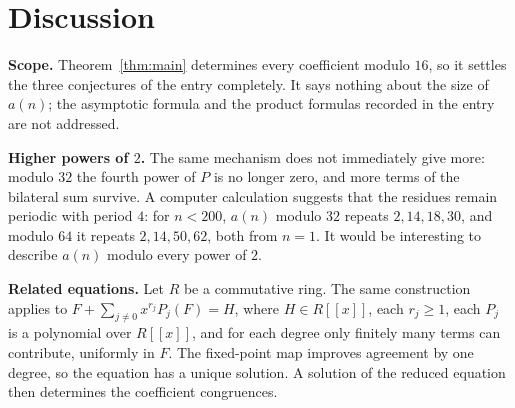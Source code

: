 \documentclass[11pt,a4paper]{article}
\theoremstyle{definition}
\theoremstyle{remark}
\newcommand{\ps}[1]{#1[[x]]}
\newcommand{\para}[1]{\par\medskip\noindent\textbf{#1}\enspace}
\begin{document}
\section{Discussion}\label{sec:discussion}

\para{Scope.} Theorem~\ref{thm:main} determines every coefficient modulo $16$, so it settles the three conjectures of the
entry completely. It says nothing about the size of $a(n)$; the asymptotic formula and the product formulas recorded in
the entry are not addressed.

\para{Higher powers of $2$.} The same mechanism does not immediately give more: modulo $32$ the fourth power of $P$ is
no longer zero, and more terms of the bilateral sum survive. A computer calculation suggests that the residues remain
periodic with period $4$: for $n<200$, $a(n)$ modulo $32$ repeats $2,14,18,30$, and modulo $64$ it repeats
$2,14,50,62$, both from $n=1$. It would be interesting to describe $a(n)$ modulo every power of $2$.

\para{Related equations.} Let $R$ be a commutative ring. The same construction applies to
$F+\sum_{j\ne0}x^{r_j}P_j(F)=H$, where $H\in\ps{R}$, each $r_j\ge1$, each $P_j$ is a polynomial
over $\ps{R}$, and for each degree only finitely many terms can contribute, uniformly in $F$.
The fixed-point map improves agreement by one degree, so the equation has a unique solution.
A solution of the reduced equation then determines the coefficient congruences.
\end{document}
